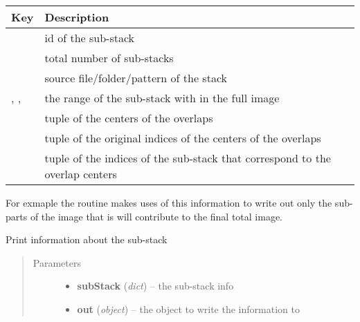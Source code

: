 \documentclass[letterpaper,10pt,english]{sphinxmanual}
\begin{document}
\begin{tabulary}{\linewidth}{|L|L|}
\hline
\textsf{\relax 
Key
} & \textsf{\relax 
Description
}\\
\hline
{}
 & 
id of the sub-stack
\\
\hline
{}
 & 
total number of sub-stacks
\\
\hline
{}
 & 
source file/folder/pattern of the stack
\\
\hline
{}, , 
 & 
the range of the sub-stack with in the full image
\\
\hline
{}
 & 
tuple of the centers of the overlaps
\\
\hline
{}
 & 
tuple of the original indices of the centers of
the overlaps
\\
\hline
{}
 & 
tuple of the indices of the sub-stack that
correspond to the overlap centers
\\
\hline\end{tabulary}


For exmaple the {\hyperref[api/ClearMap.ImageProcessing:ClearMap.ImageProcessing.StackProcessing.writeSubStack]{\emph{}}} routine makes uses of this information
to write out only the sub-parts of the image that is will contribute to the
final total image.

\begin{fulllineitems}
\label{api/ClearMap.ImageProcessing:ClearMap.ImageProcessing.StackProcessing.printSubStackInfo}
Print information about the sub-stack
\begin{quote}\begin{description}
\item[{Parameters}] \leavevmode\begin{itemize}
\item {} 
\textbf{subStack} (\emph{dict}) --
the sub-stack info

\item {} 
\textbf{out} (\emph{object}) --
the object to write the information to

\end{itemize}

\end{description}\end{quote}

\end{fulllineitems}
\end{document}
